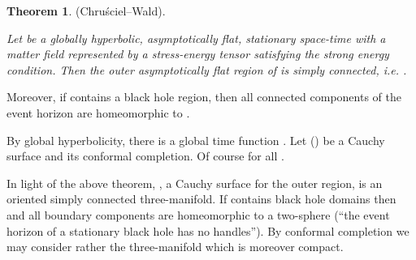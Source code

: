 \documentclass[a4paper,12pt,draft]{article}
\providecommand{\R}{{\mathbb R}}
\begin{document}
{\bf Theorem 1}. (Chru\'sciel--Wald). {\it Let \coordHE{} be a globally
hyperbolic, asymptotically flat, stationary space-time with a matter field
represented by a stress-energy tensor \coordHE{} satisfying the strong
energy condition. Then the outer asymptotically flat
region \coordHE{} of \coordHE{} is simply connected, i.e. \coordHE{}.

Moreover, if \coordHE{} contains a black hole region, then all connected
components of the event horizon \coordHE{} are homeomorphic to
\myHighlight{$S^2\times\R$}\coordHE{}.} \myHighlight{$\Diamond$}\coordHE{}
\vspace{0.1in}

\noindent By global hyperbolicity, there is a global time function \myHighlight{$T:
M\rightarrow\R$}\coordHE{} . Let \coordHE{} (\myHighlight{$t\in\R$}\coordHE{}) be a Cauchy surface and
\coordHE{} its conformal completion. Of course
\coordHE{} for all \myHighlight{$t\in\R$}\coordHE{}.

In light of the above theorem, \coordHE{}, a Cauchy surface for the
outer region, is
an oriented simply connected three-manifold. If \coordHE{} contains black hole
domains then \coordHE{}  and all boundary components
are homeomorphic to a two-sphere \coordHE{} (``the event horizon of a
stationary black hole has no handles''). By conformal completion we may
consider rather the three-manifold
\coordHE{} which is
moreover compact. 
\end{document}
